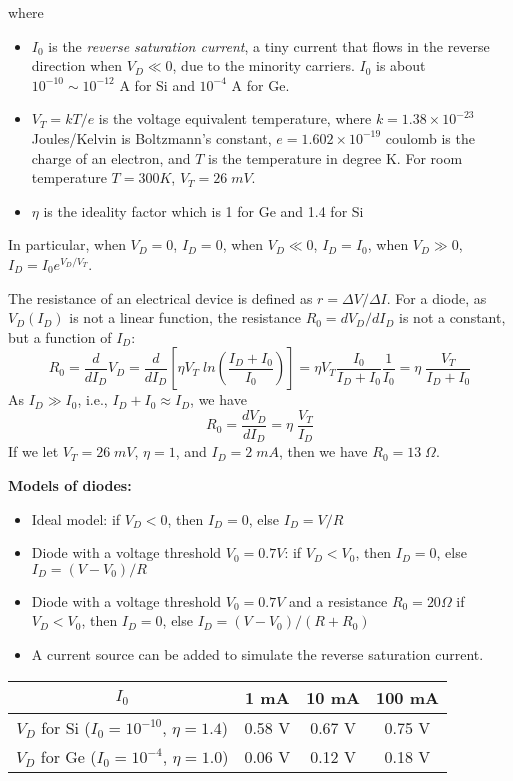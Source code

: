 where 
\begin{itemize}
\item $I_0$ is the {\em reverse saturation current}, a tiny current that 
  flows in the reverse direction when $V_D \ll 0$, due to the minority 
  carriers. $I_0$  is about $10^{-10} \sim 10^{-12}$ A for Si and $10^{-4}$
  A for Ge.
\item $ V_T=kT/e $ is the voltage equivalent temperature, where 
  $k=1.38\times 10^{-23}$ Joules/Kelvin is Boltzmann's constant, 
  $e=1.602\times 10^{-19}$ coulomb is the charge of an electron, and
  $T$ is the temperature in degree K. For room temperature $T=300K$, 
  $V_T=26\; mV$.
\item $\eta$ is the ideality factor which is 1 for Ge and 1.4 for Si
\end{itemize}
In particular, when $V_D=0$, $I_D=0$, when $V_D\ll 0$, $I_D=I_0$, when
$V_D\gg 0$, $I_D=I_0 e^{V_D/V_T}$.


The resistance of an electrical device is defined as $r=\Delta V/\Delta I$.
For a diode, as $V_D(I_D)$ is not a linear function, the resistance 
$R_0=dV_D/dI_D$ is not a constant, but a function of $I_D$:
\[
 R_0=\frac{d}{dI_D}V_D=\frac{d}{dI_D} [\eta V_T\;ln (\frac{I_D+I_0}{I_0})]
=\eta V_T \frac{I_0}{I_D+I_0}\frac{1}{I_0}=\eta \; \frac{V_T}{I_D+I_0}	\]
As $I_D \gg I_0$, i.e., $I_D+I_0\approx I_D$, we have
\[	 R_0=\frac{dV_D}{dI_D}=\eta\; \frac{V_T}{I_D}	\]
If we let $V_T=26\;mV$, $\eta=1$, and $I_D=2\;mA$, then we have 
$R_0=13\;\Omega$.

{\bf Models of diodes:}


\begin{itemize}
\item Ideal model: if $V_D<0$, then $I_D=0$, else $I_D=V/R$
\item Diode with a voltage threshold $V_0=0.7V$:
	if $V_D<V_0$, then $I_D=0$, else $I_D=(V-V_0)/R$
\item Diode with a voltage threshold $V_0=0.7V$ and a resistance $R_0=20\Omega$
	if $V_D<V_0$, then $I_D=0$, else $I_D=(V-V_0)/(R+R_0)$
\item A current source can be added to simulate the reverse saturation current.
\end{itemize}


\begin{tabular}{c||c|c|c}\\ \hline
 $I_0$	& 1 mA & 10 mA & 100 mA	\\ \hline
$V_D$ for Si ($I_0=10^{-10}$, $\eta=1.4$) & 0.58 V & 0.67 V & 0.75 V \\
$V_D$ for Ge ($I_0=10^{-4}$, $\eta=1.0$) & 0.06 V & 0.12 V & 0.18 V \\
\end{tabular}

